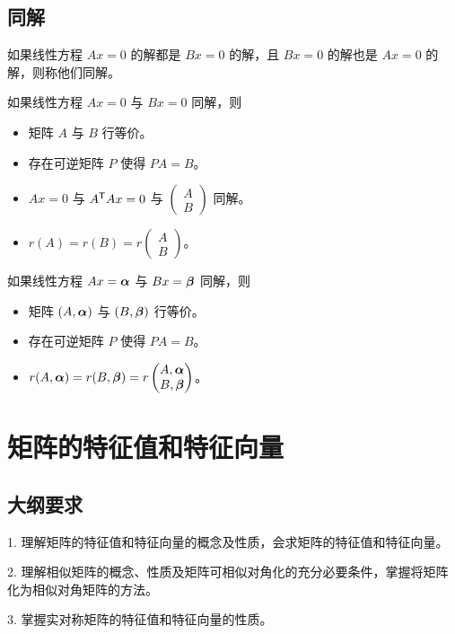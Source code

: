 \subsection{同解}

如果线性方程 $Ax=0$ 的解都是 $Bx=0$ 的解，且 $Bx=0$ 的解也是 $Ax=0$ 的解，则称他们同解。

如果线性方程 $Ax=0$ 与 $Bx=0$ 同解，则
\begin{itemize}
	\item 矩阵 $A$ 与 $B$ 行等价。
	\item 存在可逆矩阵 $P$ 使得 $PA = B$。
	\item $Ax=0$ 与 ${A}^\mathsf{T}Ax =0$ 与 $\begin{pmatrix}
			      A \\ B
		      \end{pmatrix}$ 同解。
	\item $r(A) = r(B) = r\begin{pmatrix}
			      A \\ B
		      \end{pmatrix}$。
\end{itemize}

如果线性方程 $Ax=\boldsymbol{\alpha}$ 与 $Bx=\boldsymbol{\beta}$ 同解，则
\begin{itemize}
	\item 矩阵 $(A,\boldsymbol{\alpha})$ 与 $(B,\boldsymbol{\beta})$ 行等价。
	\item 存在可逆矩阵 $P$ 使得 $PA = B$。
	\item $r(A,\boldsymbol{\alpha}) = r(B,\boldsymbol{\beta}) = r\begin{pmatrix}
			      A,\boldsymbol{\alpha} \\ B,\boldsymbol{\beta}
		      \end{pmatrix}$。
\end{itemize}

\section{矩阵的特征值和特征向量}

\subsection{大纲要求}

1. 理解矩阵的特征值和特征向量的概念及性质，会求矩阵的特征值和特征向量。

2. 理解相似矩阵的概念、性质及矩阵可相似对角化的充分必要条件，掌握将矩阵化为相似对角矩阵的方法。

3. 掌握实对称矩阵的特征值和特征向量的性质。

